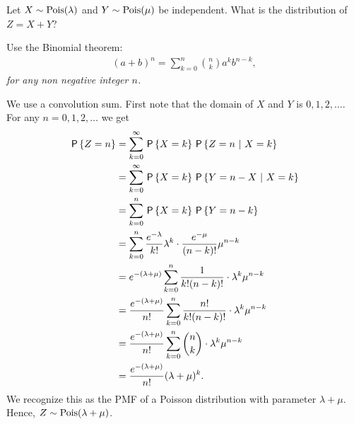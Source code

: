 \begin{exercise}
Let $X \sim \Pois{\lambda}$ and $Y \sim \Pois{\mu}$ be independent. What is the distribution of $Z = X + Y$?\\
\begin{hint}
Use the Binomial theorem:
\begin{align}
    (a + b)^n = \sum_{k=0}^n {n \choose k}a^k b^{n-k},
\end{align}
\textit{for any non negative integer $n$.}
\end{hint}

\begin{solution}
We use a convolution sum. First note that the domain of $X$ and $Y$ is $0,1,2,\ldots$. For any $n=0,1,2,\ldots$ we get
\begin{align}
    \P{Z = n} &= \sum_{k=0}^\infty \P{X = k} \P{Z = n \ | \ X = k} \\
    &= \sum_{k=0}^\infty \P{X = k} \P{Y = n - X \ | \ X = k} \\
    &= \sum_{k=0}^n \P{X = k} \P{Y = n - k} \\
    &= \sum_{k=0}^n \frac{e^{-\lambda}}{k!}\lambda^k  \cdot \frac{e^{-\mu}}{(n-k)!}\mu^{n-k}  \\
    &= e^{-(\lambda+\mu)} \sum_{k=0}^n \frac{1}{k!(n-k)!} \cdot \lambda^k\mu^{n-k}  \\
    &= \frac{e^{-(\lambda+\mu)}}{n!} \sum_{k=0}^n \frac{n!}{k!(n-k)!} \cdot \lambda^k\mu^{n-k}  \\
    &= \frac{e^{-(\lambda+\mu)}}{n!} \sum_{k=0}^n {n \choose k} \cdot \lambda^k\mu^{n-k}  \\
    &= \frac{e^{-(\lambda+\mu)}}{n!} (\lambda + \mu)^k.
\end{align}
We recognize this as the PMF of a Poisson distribution with parameter $\lambda+\mu$. Hence, $Z \sim \Pois{\lambda + \mu}$.
\end{solution}
\end{exercise}

